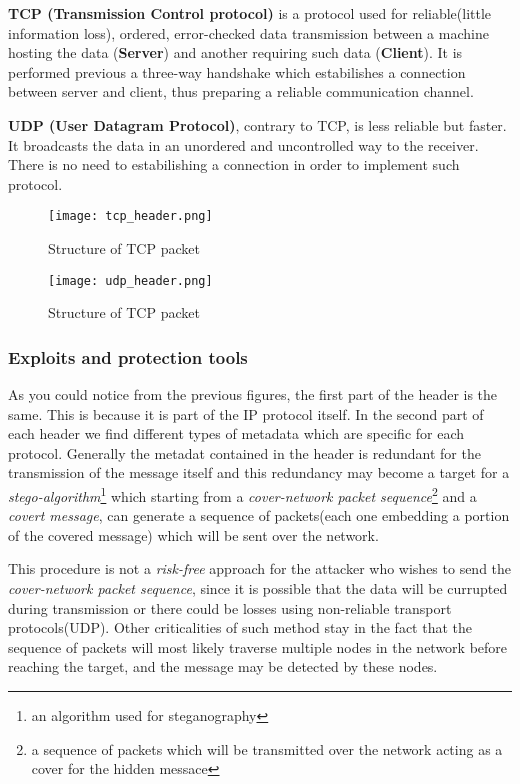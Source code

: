 \documentclass[../../main.tex]{subfiles}
\begin{document}
    \textbf{TCP (Transmission Control protocol)} is a protocol used for reliable(little information loss), ordered, error-checked data transmission between a machine
    hosting the data (\textbf{Server}) and another requiring such data (\textbf{Client}). It is performed previous a three-way handshake which estabilishes a connection between server and client, thus preparing 
    a reliable communication channel.

    \textbf{UDP (User Datagram Protocol)}, contrary to TCP, is less reliable but faster.
     It broadcasts the data in an unordered and uncontrolled way to the receiver. 
    There is no need to estabilishing a connection in order to implement such protocol.

    \begin{figure}[h]
        \centering
        \caption{Structure of TCP packet}
        \texttt{[image: tcp\_header.png]}
    \end{figure}

    \begin{figure}[h]
        \centering
        \caption{Structure of TCP packet}
        \texttt{[image: udp\_header.png]}
    \end{figure}

    \pagebreak

    \subsubsection{Exploits and protection tools}

    As you could notice from the previous figures, the first part of the header is the same. This is because it is part of the IP protocol itself.
    In the second part of each header we find different types of metadata which are specific for each protocol. Generally the metadat contained in the header is redundant 
    for the transmission of the message itself and this redundancy may become a target for a \emph{stego-algorithm}\footnote{an algorithm used for steganography} which starting from a 
    \emph{cover-network packet sequence}\footnote{a sequence of packets which will be transmitted over the network acting as a cover for the hidden messace} and a \emph{covert message}, can generate a sequence of packets(each one embedding a portion of the covered message) which will be sent over the network.

    This procedure is not a \emph{risk-free} approach for the attacker who wishes to send the \emph{cover-network packet sequence}, since it is possible that the data will be currupted during transmission or there could be losses using non-reliable transport protocols(UDP).
    Other criticalities of such method stay in the fact that the sequence of packets will most likely traverse multiple nodes in the network before reaching the target, and the message may be detected by these nodes.
\end{document}
